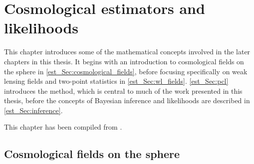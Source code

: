 
% 
% 

% 

\chapter{Cosmological estimators and likelihoods}
\label{chap:est_like}

This chapter introduces some of the mathematical concepts involved in the later chapters in this thesis. It begins with an introduction to cosmological fields on the sphere in \autoref{est_Sec:cosmological_fields}, before focusing specifically on weak lensing fields and two-point statistics in \autoref{est_Sec:wl_fields}. \autoref{est_Sec:pcl} introduces the \pcl{} method, which is central to much of the work presented in this thesis, before the concepts of Bayesian inference and likelihoods are described in \autoref{est_Sec:inference}.

This chapter has been compiled from \citet{Heavens2003, Chon2004, Brown2005, Kilbinger2017, Chisari2019, Fang2020b}.

\section{Cosmological fields on the sphere}
\label{est_Sec:cosmological_fields}


